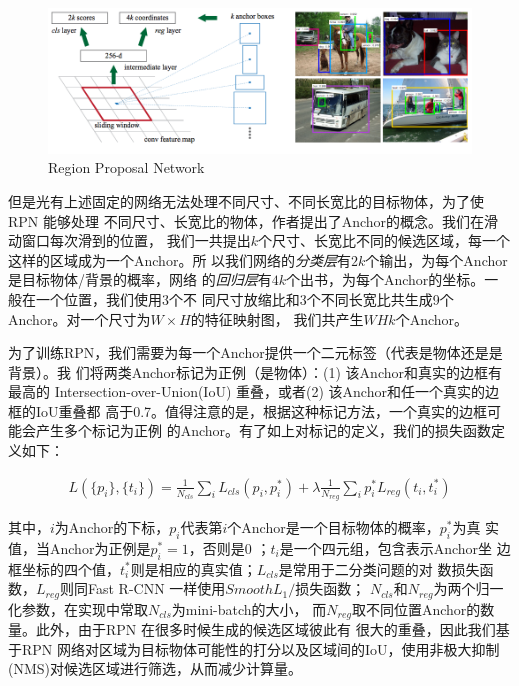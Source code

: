 \begin{figure}[ht]
  \centering
  \includegraphics[width=1.0\linewidth]{./Figure/RPN.png}
  \caption{Region Proposal Network\cite{Ren:2015ug}}\label{Fig:RPN}
\end{figure}

但是光有上述固定的网络无法处理不同尺寸、不同长宽比的目标物体，为了使RPN 能够处理
不同尺寸、长宽比的物体，作者提出了Anchor的概念。我们在滑动窗口每次滑到的位置，
我们一共提出$k$个尺寸、长宽比不同的候选区域，每一个这样的区域成为一个Anchor。所
以我们网络的\textit{分类层}有$2k$个输出，为每个Anchor是目标物体/背景的概率，网络
的\textit{回归层}有$4k$个出书，为每个Anchor的坐标。一般在一个位置，我们使用3个不
同尺寸放缩比和3个不同长宽比共生成9个Anchor。对一个尺寸为$W \times H$的特征映射图，
我们共产生$WHk$个Anchor。

为了训练RPN，我们需要为每一个Anchor提供一个二元标签（代表是物体还是是背景）。我
们将两类Anchor标记为正例（是物体）：(1) 该Anchor和真实的边框有最高的
Intersection-over-Union(IoU) 重叠，或者(2) 该Anchor和任一个真实的边框的IoU重叠都
高于0.7。值得注意的是，根据这种标记方法，一个真实的边框可能会产生多个标记为正例
的Anchor。有了如上对标记的定义，我们的损失函数定义如下：

\begin{align}
L(\{p_i\}, \{t_i\}) = \frac{1}{N_{cls}}\sum_i{L_{cls}(p_i, p_i^*)} + \lambda\frac{1}{N_{reg}}\sum_i{p_i^*L_{reg}(t_i,t_i^*)}
\end{align}

其中，$i$为Anchor的下标，$p_i$代表第$i$个Anchor是一个目标物体的概率，$p_i^*$为真
实值，当Anchor为正例是$p_i^* = 1$，否则是0 ；$t_i$是一个四元组，包含表示Anchor坐
边框坐标的四个值，$t_i^*$则是相应的真实值；$L_{cls}$是常用于二分类问题的对
数损失函数，$L_{reg}$则同Fast R-CNN 一样使用$Smooth L_1/$损失函数；
$N_{cls}$和$N_{reg}$为两个归一化参数，在实现中常取$N_{cls}$为mini-batch的大小，
而$N_{reg}$取不同位置Anchor的数量。此外，由于RPN 在很多时候生成的候选区域彼此有
很大的重叠，因此我们基于RPN 网络对区域为目标物体可能性的打分以及区域间的IoU，使用非极大抑制
(NMS)对候选区域进行筛选，从而减少计算量。

